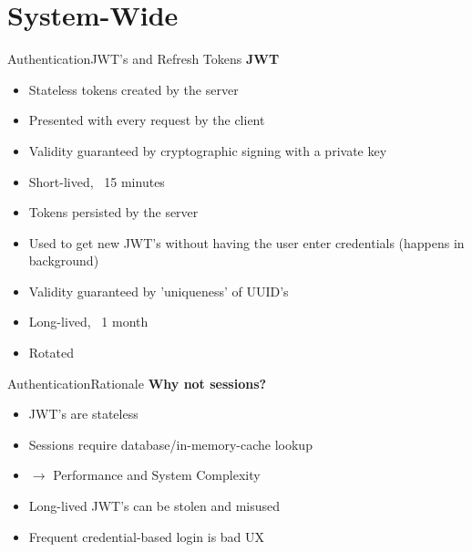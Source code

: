\documentclass{sdqbeamer}[en]
\begin{document}
\section{System-Wide}

\begin{frame}{Authentication}{JWT's and Refresh Tokens}
    \textbf{JWT}
    \begin{itemize}
        \item Stateless tokens created by the server
        \item Presented with every request by the client
        \item Validity guaranteed by cryptographic signing with a private key
        \item Short-lived, ~15 minutes
    \end{itemize}
    \vspace{0.5em}
    \begin{itemize}
        \item<2-> Tokens persisted by the server
        \item<2-> Used to get new JWT's without having the user enter credentials (happens in background)
        \item<2-> Validity guaranteed by 'uniqueness' of UUID's
        \item<2-> Long-lived, ~1 month
        \item<2-> Rotated
    \end{itemize}
\end{frame}

\begin{frame}{Authentication}{Rationale}
    \textbf{Why not sessions?}
    \begin{itemize}
        \item JWT's are stateless
        \item Sessions require database/in-memory-cache lookup
        \item $\rightarrow$ Performance and System Complexity
    \end{itemize}
    \vspace{0.5em}
    \begin{itemize}
        \item<2-> Long-lived JWT's can be stolen and misused
        \item<2-> Frequent credential-based login is bad UX
    \end{itemize}
\end{frame}
\end{document}
